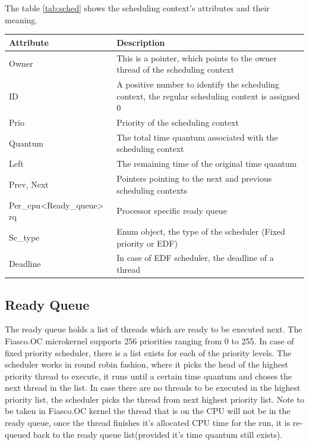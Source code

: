 The table \ref{tab:sched} shows the scheduling context's attributes and their meaning.
\begin{center}
\begin{tabular}{|l|p{9cm}|}
\hline 
\textbf{Attribute} & \textbf{Description} \\ \hline

Owner & This is a pointer, which points to the owner thread of the scheduling context\\ \hline

ID & A positive number to identify the scheduling context, the regular scheduling context is assigned 0
\\ \hline

Prio & Priority of the scheduling context \\ \hline

Quantum &  The total time quantum associated with the scheduling context\\ \hline

Left & The remaining time of the original time quantum \\ \hline

Prev, Next & Pointers pointing to the next and previous scheduling contexts \\ \hline

Per\_cpu<Ready\_queue> rq &  Processor specific ready queue \\ \hline

Sc\_type & Enum object, the type of the scheduler (Fixed priority or EDF) \\ \hline

Deadline & In case of EDF scheduler, the deadline of a thread \\ \hline
\end{tabular}
\label{tab:sched}
\end{center}

\subsection{Ready Queue}\label{Foundations:rq}
The ready queue holds a list of threads which are ready to be executed next. The Fiasco.OC microkernel supports 256 priorities ranging from 0 to 255. In case of fixed priority scheduler, there is a list exists for each of the priority levels. The scheduler works in round robin fashion, where it picks the head of the highest priority thread to execute, it runs until a certain time quantum and choses the next thread in the list. In case there are no threads to be executed in the highest priority list, the scheduler picks the thread from next highest priority list. 
Note to be taken in Fiasco.OC kernel the thread that is on the CPU will not be in the ready queue, once the thread finishes it's allocated CPU time for the run, it is re-queued back to the ready queue list(provided it's time quantum still exists).

